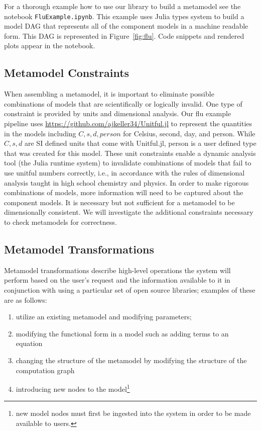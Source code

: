 \documentclass{article}
\providecommand{\tightlist}{%
  \setlength{\itemsep}{0pt}\setlength{\parskip}{0pt}}
\begin{document}
For a thorough example how to use our library to build a metamodel see the notebook \texttt{FluExample.ipynb}. This example uses Julia types system to build a model DAG that represents all of the component models in a machine readable form. This DAG is represented in Figure~\ref{fig:flu}. Code snippets and rendered plots appear in the notebook.

%
\subsection{Metamodel Constraints}
When assembling a metamodel, it is important to eliminate possible combinations of models that are scientifically or logically invalid. One type of constraint is provided by units and dimensional analysis. Our flu example pipeline uses \href{Unitful.jl}{https://github.com/ajkeller34/Unitful.jl} to represent the quantities in the models including $C,s,d,person$ for Celsius, second, day, and person. While $C,s,d$ are SI defined units that come with Unitful.jl, person is a user defined type that was created for this model. These unit constraints enable a dynamic analysis tool (the Julia runtime system) to invalidate combinations of models that fail to use unitful numbers correctly, i.e., in accordance with the rules of dimensional analysis taught in high school chemistry and physics. In order to make rigorous combinations of models, more information will need to be captured about the component models. It is necessary but not sufficient for a metamodel to be dimensionally consistent. We will investigate the additional constraints necessary to check metamodels for correctness. 

\subsection{Metamodel Transformations}

Metamodel transformations describe high-level operations the system will perform based on the user's request and the information available to it in conjunction with using a particular set of open source libraries; examples of these are as follows: 

\begin{enumerate}\tightlist
    \item utilize an existing metamodel and modifying parameters;
    \item modifying the functional form in a model such as adding terms to an equation
    \item changing the structure of the metamodel by modifying the structure of the computation graph
    \item introducing new nodes to the model\footnote{new model nodes must first be ingested into the system in order to be made available to users.}
\end{enumerate}
\end{document}
